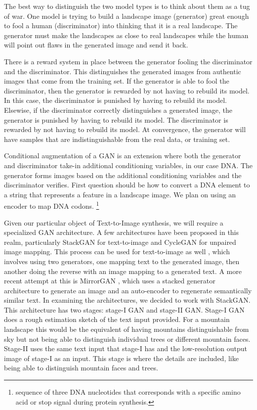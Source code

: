 \documentclass{article}
\begin{document}
	The best way to distinguish the two model types is to think about them as a tug of war. One model is trying to build a landscape image (generator) great enough to fool a human (discriminator) into thinking that it is a real landscape. The generator must make the landscapes as close to real landscapes while the human will point out flaws in the generated image and send it back.  
	
	There is a reward system in place between the generator fooling the discriminator and the discriminator.  This distinguishes the generated images from authentic images that come from the training set. If the generator is able to fool the discriminator, then the generator is rewarded by not having to rebuild its model.  In this case, the discriminator is punished by having to rebuild its model. Elsewise, if the discriminator correctly distinguishes a generated image, the generator is punished by having to rebuild its model.  The discriminator is rewarded by not having to rebuild its model. At convergence, the generator will have samples that are indistinguishable from the real data, or training set.  

	Conditional augmentation of a GAN is an extension where both the generator and discriminator take-in additional conditioning variables, in our case DNA.  The generator forms images based on the additional conditioning variables and the discriminator verifies. First question should be how to convert a DNA element to a string that represents a feature in a landscape image. We plan on using an encoder to map DNA codons. \footnote{sequence of three DNA nucleotides that corresponds with a specific amino acid or stop signal during protein synthesis.}   

	Given our particular object of Text-to-Image synthesis, we will require a specialized GAN architecture. A few architectures have been proposed in this realm, particularly StackGAN \cite{zhang2017stackgan} for text-to-image and CycleGAN \cite{CycleGAN2017} for unpaired image mapping. This process can be used for text-to-image as well \cite{BERT2020}, which involves using two generators, one mapping text to the generated image, then another doing the reverse with an image mapping to a generated text. A more recent attempt at this is MirrorGAN \cite{qiao2019mirrorgan}, which uses a stacked generator architecture to generate an image and an auto-encoder to regenerate semantically similar text. In examining the architectures, we decided to work with StackGAN. This architecture has two stages: stage-I GAN and stage-II GAN. Stage-I GAN does a rough estimation sketch of the text input provided. For a mountain landscape this would be the equivalent of having mountains distinguishable from sky but not being able to distinguish individual trees or different mountain faces. Stage-II uses the same text input that stage-I has and the low-resolution output image of stage-I as an input. This stage is where the details are included, like being able to distinguish mountain faces and trees.   
\end{document}
